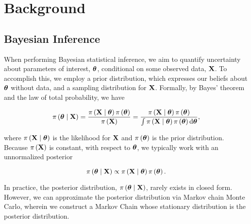 \chapter{Background}
\label{ch:background}
\section{Bayesian Inference}
\label{ch_2:sec:bayesian-mcmc}

When performing Bayesian statistical inference, we aim to quantify uncertainty about parameters of interest, \( \boldsymbol{\theta} \), conditional on some observed data, \( \mathbf{X} \).
To accomplish this, we employ a prior distribution, which expresses our beliefs about \( \boldsymbol{\theta} \) without data, and a sampling distribution for \( \mathbf{X} \).
Formally, by Bayes' theorem and the law of total probability, we have 

\begin{equation}
    \pi \left( \boldsymbol{\theta} \mid \mathbf{X} \right) = \frac{\pi \left( \mathbf{X} \mid \boldsymbol{\theta} \right) \pi \left( \boldsymbol{\theta} \right)}{\pi \left(  \mathbf{X} \right)} = \frac{\pi \left( \mathbf{X} \mid \boldsymbol{\theta} \right) \pi \left( \boldsymbol{\theta} \right)}{\int \pi \left( \mathbf{X} \mid \boldsymbol{\theta} \right) \pi \left( \boldsymbol{\theta} \right) \mathrm{d} \boldsymbol{\theta}},
\end{equation}

where \( \pi \left( \mathbf{X} \mid \boldsymbol{\theta} \right) \) is the likelihood for \( \mathbf{X} \) and \( \pi \left( \boldsymbol{\theta} \right) \) is the prior distribution.
Because \( \pi \left( \mathbf{X} \right) \) is constant, with respect to \( \boldsymbol{\theta} \), we typically work with an unnormalized posterior

\begin{equation}
    \pi \left( \boldsymbol{\theta} \mid \mathbf{X} \right) \propto \pi \left( \mathbf{X} \mid \boldsymbol{\theta} \right) \pi \left( \boldsymbol{\theta} \right).
\end{equation}

In practice, the posterior distribution, \( \pi \left( \boldsymbol{\theta} \mid \mathbf{X} \right) \), rarely exists in closed form.
However, we can approximate the posterior distribution via Markov chain Monte Carlo, wherein we construct a Markov Chain whose stationary distribution is the posterior distribution.

